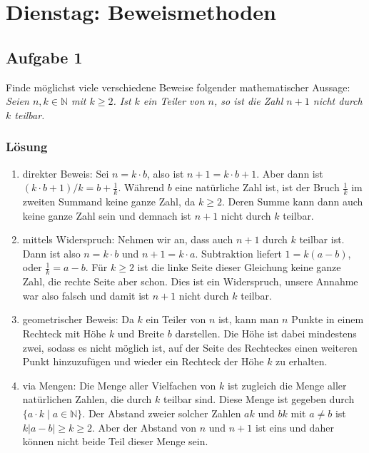 \documentclass[a4paper,10pt]{article}
\newcommand{\N}{\mathbb{N}}
\newcommand{\s}[1]{#1}
\begin{document}
\section*{Dienstag: Beweismethoden}


\subsection*{Aufgabe 1}

Finde möglichst viele verschiedene Beweise folgender mathematischer Aussage:\\
\emph{Seien $n,k\in\N$ mit $k \ge 2$. Ist $k$ ein Teiler von $n$, so ist die Zahl $n + 1$ nicht durch $k$ teilbar.}

\s{\subsubsection*{Lösung}
	\begin{enumerate}
		\item direkter Beweis: Sei $n = k \cdot b$, also ist $n+1 = k \cdot b +1$. Aber dann ist $(k \cdot b+1)/k = b + \frac{1}{k}$. Während $b$ eine natürliche Zahl ist, ist der Bruch $\frac{1}{k}$ im zweiten Summand keine ganze Zahl, da $k \ge 2$. Deren Summe kann dann auch keine ganze Zahl sein und demnach ist $n+1$ nicht durch $k$ teilbar.
		\item mittels Widerspruch: Nehmen wir an, dass auch $n+1$ durch $k$ teilbar ist. Dann ist also $n = k \cdot b$ und $n+1= k \cdot a$. Subtraktion liefert $1 = k (a - b)$, oder $\frac{1}{k} = a-b$. Für $k \ge 2$ ist die linke Seite dieser Gleichung keine ganze Zahl, die rechte Seite aber schon. Dies ist ein Widerspruch, unsere Annahme war also falsch und damit ist $n+1$ nicht durch $k$ teilbar.
		\item geometrischer Beweis: Da $k$ ein Teiler von $n$ ist, kann man $n$ Punkte in einem Rechteck mit Höhe $k$ und Breite $b$ darstellen. Die Höhe ist dabei mindestens zwei, sodass es nicht möglich ist, auf der Seite des Rechteckes einen weiteren Punkt hinzuzufügen und wieder ein Rechteck der Höhe $k$ zu erhalten.
		\item via Mengen: Die Menge aller Vielfachen von $k$ ist zugleich die Menge aller natürlichen Zahlen, die durch $k$ teilbar sind. Diese Menge ist gegeben durch $\{ a \cdot k \mid a \in \mathbb{N} \}$. Der Abstand zweier solcher Zahlen $ak$ und $bk$ mit $a \neq b$ ist $k \lvert a - b \rvert \ge k \ge 2$. Aber der Abstand von $n$ und $n+1$ ist eins und daher können nicht beide Teil dieser Menge sein.
	\end{enumerate}
}
\end{document}
